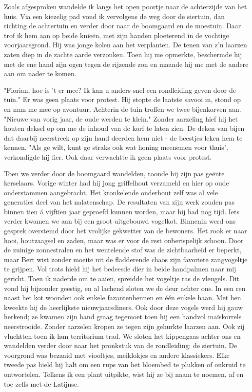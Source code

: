 \documentclass[12pt, justified, a4paper, symmetric]{tufte-book}
\begin{document}
Zoals afgesproken wandelde ik langs het open poortje naar de achterzijde van het huis. Via een kiezelig pad vond ik vervolgens de weg door de siertuin, dan richting de achtertuin en verder door naar de boomgaard en de moestuin. Daar trof ik hem aan op beide knie\"en, met zijn handen ploeterend in de vochtige voorjaarsgrond. Hij was jonge kolen aan het verplanten. De tenen van z'n laarzen zaten diep in de zachte aarde verzonken. Toen hij me opmerkte, beschermde hij met de ene hand zijn ogen tegen de rijzende zon en maande hij me met de andere aan om nader te komen.

"Florian, hoe is 't er mee? Ik kan u anders snel een rondleiding geven door de tuin." Er was geen plaats voor protest. Hij stopte de laatste savooi in, stond op en nam me mee op avontuur. Achterin de tuin troffen we twee bijenkorven aan. "Nieuwe van vorig jaar, de oude werden te klein." Zonder aarzeling hief hij het houten deksel op om me de inhoud van de korf te laten zien. De deken van bijen dat daarbij neerstreek op zijn hand deerden hem niet - de beestjes leken hem te kennen. "Als ge wilt, kunt ge straks ook wat honing meenemen voor thuis", verkondigde hij fier. Ook daar verwachtte ik geen plaats voor protest.

Toen we verder door de boomgaard wandelden, toonde hij zijn pas ge\"ente kerselaars. Vorige winter had hij jong griffelhout verzameld en hier op oude onderstammen aangebracht. Het kronkelende onderhout zelf was al vele generaties deel van het nalatenschap. De resultaten van zijn werk zouden pas binnen tien \'a vijftien jaar geproefd kunnen worden, maar hij had nog tijd. Iets verder kwamen we aan bij een groot uitgebouwd vogelkot. Binnenin werd ons gesprek overstemd door het vrolijke gekwetter van de bewoners. Het rook er naar hooi, houtzaagsel en zaden, maar was er voor de rest onberispelijk schoon. Door de zuinige zonnestralen en het wentelende stof was de zichtbaarheid er beperkt, maar Bert wist zonder moeite uit de fladderende chaos zijn favoriete zangvogeltje te grijpen. Vol trots hield hij het bedeesde dier in beide handpalmen naar mij gericht. Toen ik naderde om te aaien, spreidde het vogeltje ras de vleugels. Dit vond hij bijzonder geestig, en al lachend sloten we de deur achter ons. In een ren naast het kot woonden ook enkele fazantenhennen en \'e\'en enkele haan. Met hen kweekte hij de heerlijkste nieuwjaarsdiners. Ook door deze vogels werd hij gauw herkend; ze kwamen zijn hand graag tegemoet toen hij een handvol ma\"iskorrels neerstrooide. Zonder aarzelen kropen ze tegen zijn gehurkte laarzen aan. Ook zij vluchtten toen ik hun territorium trad. We sloten het kippengaas achter ons en wandelden verder door naar het pronkstuk van de rondleiding: de siertuin. De voorgrond was bezaaid met viooltjes, meiklokjes en andere klassiekers. Elke tweede pas hield hij halt om een rups van het bloembed te plukken of onkruid te ontwortelen. Telkens ik een plant uitpikte, wist hij ze bij naam te noemen, af en toe zelfs met de Latijnse.
\end{document}
